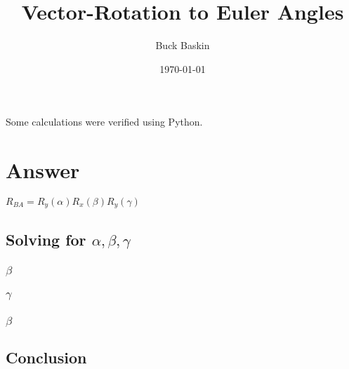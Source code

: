 \documentclass{article}%
\title{Vector{-}Rotation to Euler Angles}%
\author{Buck Baskin}%
\date{\today}%
\begin{document}
%
\normalsize%
\maketitle%
Some calculations were verified using Python.%
\section{Answer}%
$R_{BA} = R_{y}(\alpha) R_{x}(\beta) R_{y}(\gamma)$%
\subsection{Solving for $\alpha, \beta, \gamma$}%
\subsubsection{$\beta$}%

%
\subsubsection{$\gamma$}%

%
\subsubsection{$\beta$}%

%
\subsection{Conclusion}%

%
\end{document}
